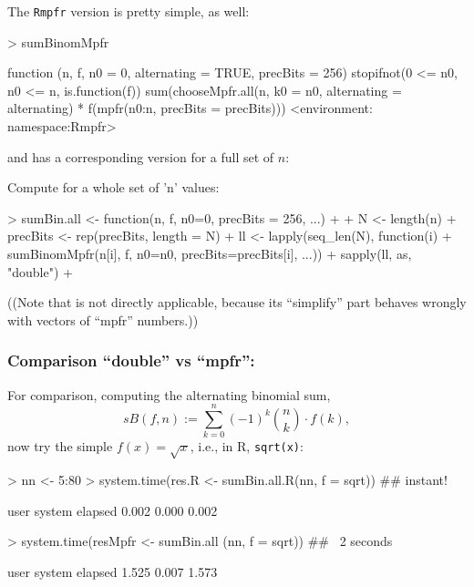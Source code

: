 \begin{frame}[fragile]
The \texttt{Rmpfr} version is pretty simple, as well:

\medskip

\begin{Schunk}
\begin{Sinput}
> sumBinomMpfr
\end{Sinput}
\begin{Soutput}
function (n, f, n0 = 0, alternating = TRUE, precBits = 256) 
{
    stopifnot(0 <= n0, n0 <= n, is.function(f))
    sum(chooseMpfr.all(n, k0 = n0, alternating = alternating) * 
        f(mpfr(n0:n, precBits = precBits)))
}
<environment: namespace:Rmpfr>
\end{Soutput}
\end{Schunk}
\smallskip

and has a corresponding version for a full set of $n$:
\end{frame}

\begin{frame}[fragile]
Compute   for a whole set of 'n' values:
\begin{Schunk}
\begin{Sinput}
> sumBin.all <- function(n, f, n0=0, precBits = 256, ...)
+ {
+   N <- length(n)
+   precBits <- rep(precBits, length = N)
+   ll <- lapply(seq_len(N), function(i)
+            sumBinomMpfr(n[i], f, n0=n0, precBits=precBits[i], ...))
+   sapply(ll, as, "double")
+ }
\end{Sinput}
\end{Schunk}
\medskip
((Note that  is not directly applicable, because its
 ``simplify'' part behaves wrongly with vectors of ``mpfr'' numbers.))
\end{frame}

\begin{frame}[fragile]\frametitle{Comparison ``double'' vs ``mpfr'':}
For comparison, computing the alternating binomial sum,
\begin{equation*}
 sB(f,n) := \sum_{k=0}^{n} (-1)^k {n \choose k}\cdot f(k),
\end{equation*}
now try the simple  $f(x) = \sqrt{x}$, i.e., in R, \texttt{sqrt(x)}:
\medskip

\begin{Schunk}
\begin{Sinput}
> nn <- 5:80
> system.time(res.R   <- sumBin.all.R(nn, f = sqrt)) ## instant!
\end{Sinput}
\begin{Soutput}
   user  system elapsed 
  0.002   0.000   0.002 
\end{Soutput}
\begin{Sinput}
> system.time(resMpfr <- sumBin.all  (nn, f = sqrt)) ## ~2 seconds
\end{Sinput}
\begin{Soutput}
   user  system elapsed 
  1.525   0.007   1.573 
\end{Soutput}
\end{Schunk}
\end{frame}

